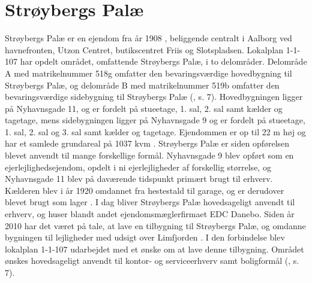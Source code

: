 \section{Strøybergs Palæ}
Strøybergs Palæ er en ejendom fra år 1908 \citep{byggesagen}, beliggende centralt i Aalborg ved havnefronten, Utzon Centret, butikscentret Friis og Slotspladsen.
\newline \indent{     }  Lokalplan 1-1-107 har opdelt området, omfattende Strøybergs Palæ, i to delområder. Delområde A med matrikelnummer 518g omfatter den bevaringsværdige hovedbygning til Strøybergs Palæ, og delområde B med matrikelnummer 519b omfatter den bevaringsværdige sidebygning til Strøybergs Palæ (\citep{lokalplan}, s. 7). Hovedbygningen ligger på Nyhavnsgade 11, og er fordelt på stueetage, 1. sal, 2. sal samt kælder og tagetage, mens sidebygningen ligger på Nyhavnsgade 9 og er fordelt på stueetage, 1. sal, 2. sal og 3. sal samt kælder og tagetage. Ejendommen er op til 22 m høj og har et samlede grundareal på 1037 kvm \citep{byggesagen}.
\newline 
\newline 
Strøybergs Palæ er siden opførelsen blevet anvendt til mange forskellige formål. Nyhavnsgade 9 blev opført som en ejerlejlighedsejendom, opdelt i ni ejerlejligheder af forskellig størrelse, og Nyhavnsgade 11 blev på daværende tidspunkt primært brugt til erhverv. Kælderen blev i år 1920 omdannet fra hestestald til garage, og er derudover blevet brugt som lager \citep{byggesagen}. I dag bliver Strøybergs Palæ hovedsageligt anvendt til erhverv, og huser blandt andet ejendomsmæglerfirmaet EDC Danebo.
\newline \indent{     }  Siden år 2010 har det været på tale, at lave en tilbygning til Strøybergs Palæ, og omdanne bygningen til lejligheder med udsigt over Limfjorden \citep{Calum}. I den forbindelse blev lokalplan 1-1-107 udarbejdet med et ønske om at lave denne tilbygning. Området ønskes hovedsageligt anvendt til kontor- og serviceerhverv samt boligformål (\citep{lokalplan}, s. 7).